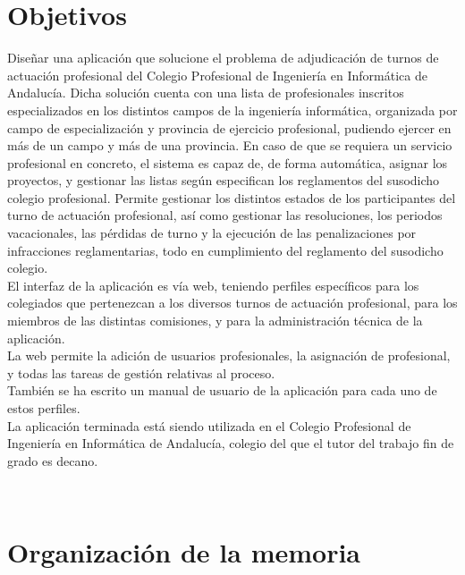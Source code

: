 \documentclass[12pt,a4paper,spanish]{book}
\newcounter{rf}
\newcounter{ri}
\begin{document}
\section{Objetivos}


Diseñar una aplicación que solucione el problema de adjudicación de turnos de actuación profesional del Colegio Profesional de Ingeniería en Informática de Andalucía. Dicha solución cuenta con una lista de profesionales inscritos especializados en los distintos campos de la ingeniería informática, organizada por campo de especialización y provincia de ejercicio profesional, pudiendo ejercer en más de un campo y más de una provincia. En caso de que se requiera un servicio profesional en concreto, el sistema es capaz de, de forma automática, asignar los proyectos, y gestionar las listas según especifican los reglamentos del susodicho colegio profesional. Permite gestionar los distintos estados de los participantes del turno de actuación profesional, así como gestionar las resoluciones, los periodos vacacionales, las pérdidas de turno y la ejecución de las penalizaciones por infracciones reglamentarias, todo en cumplimiento del reglamento del susodicho colegio. \\

El interfaz de la aplicación es vía web, teniendo perfiles específicos para los colegiados que pertenezcan a los diversos turnos de actuación profesional, para los miembros de las distintas comisiones, y para la administración técnica de la aplicación. \\

La web permite la adición de usuarios profesionales, la asignación de profesional, y todas las tareas de gestión relativas al proceso. \\

También se ha escrito un manual de usuario de la aplicación para cada uno de estos perfiles. \\

La aplicación terminada está siendo utilizada en el Colegio Profesional de Ingeniería en Informática de Andalucía, colegio del que el tutor del trabajo fin de grado es decano.

\newpage~
\section{Organización de la memoria}
\end{document}
